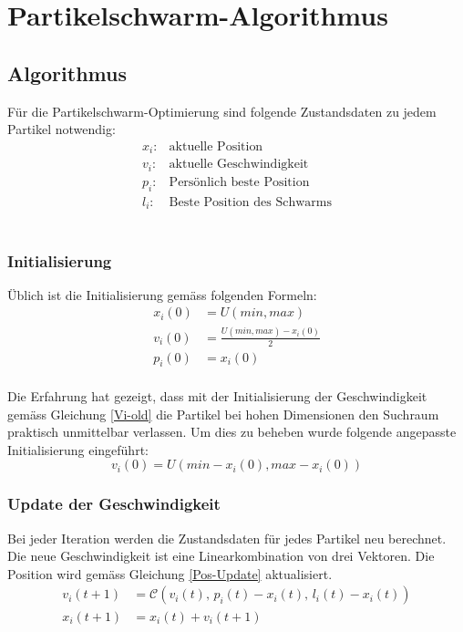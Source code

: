\section{Partikelschwarm-Algorithmus}

\subsection{Algorithmus}
Für die Partikelschwarm-Optimierung sind folgende Zustandsdaten zu jedem Partikel notwendig: \\
\begin{align*}
	x_i: & \text{aktuelle Position}\\
	v_i: & \text{aktuelle Geschwindigkeit}\\
	p_i: & \text{Persönlich beste Position} \\
	l_i: & \text{Beste Position des Schwarms}
\end{align*} \\

\subsubsection{Initialisierung}
Üblich ist die Initialisierung gemäss folgenden Formeln: \\
\begin{align}
	x_i(0) &= U(min,max) \\
	v_i(0) &= \frac{U(min,max) - x_i(0)}{2} \label{Vi-old} \\ 
	p_i(0) &= x_i(0)
\end{align} \\
Die Erfahrung hat gezeigt, dass mit der Initialisierung der Geschwindigkeit gemäss Gleichung \ref{Vi-old} die Partikel bei hohen Dimensionen den Suchraum praktisch unmittelbar verlassen. Um dies zu beheben wurde folgende angepasste Initialisierung eingeführt: \\
\begin{equation}
	v_i(0) = U(min - x_i(0), max - x_i(0))
\end{equation}

\subsubsection{Update der Geschwindigkeit}
Bei jeder Iteration werden die Zustandsdaten für jedes Partikel neu berechnet. Die neue Geschwindigkeit ist eine Linearkombination von drei Vektoren. Die Position wird gemäss Gleichung \ref{Pos-Update} aktualisiert. \\
\begin{align}
	v_{i}(t+1) &= \mathcal{C}(v_i(t),\, p_i(t)-x_i(t),\, l_i(t)-x_i(t)) \\
	x_{i}(t+1) &= x_i(t) + v_i(t+1) \label{Pos-Update}
\end{align}

